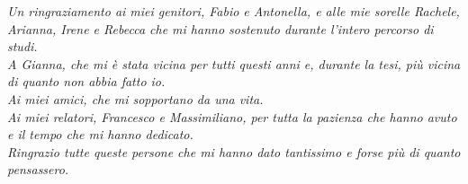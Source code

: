\thispagestyle{empty}
    \null{}

        \begin{flushright}
           \textit{\large Un ringraziamento ai miei genitori, Fabio e Antonella, e alle mie sorelle Rachele, Arianna, Irene e Rebecca che mi hanno sostenuto durante l'intero percorso di studi.\\[1cm]
           \large A Gianna, che mi è stata vicina per tutti questi anni e, durante la tesi, più vicina di quanto non abbia fatto io.\\[1cm]
           \large Ai miei amici, che mi sopportano da una vita.\\[1cm]
           \large Ai miei relatori, Francesco e Massimiliano, per tutta la pazienza che hanno avuto e il tempo che mi hanno dedicato.\\[1cm]
           Ringrazio tutte queste persone che mi hanno dato tantissimo e forse più di quanto pensassero.}
        \end{flushright}
        
\null
